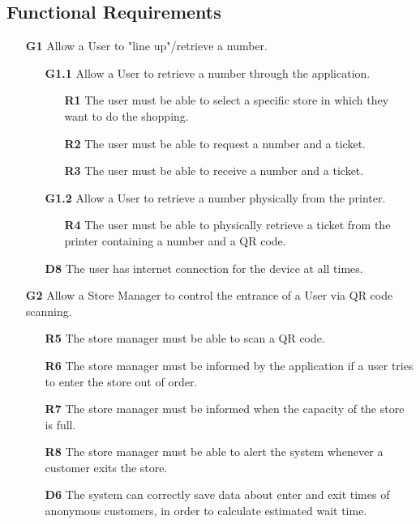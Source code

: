 \subsection{Functional Requirements}
\begin{enumerate}
	\item [\textbf{G1}] Allow a User to "line up"/retrieve a number.
	\begin{enumerate}
		\item [\textbf{G1.1}] Allow a User to retrieve a number through the application.
		\begin{enumerate}
			\item [\textbf{R1}] The user must be able to select a specific store in which they want to do the shopping.
			\item [\textbf{R2}] The user must be able to request a number and a ticket.
			\item [\textbf{R3}] The user must be able to receive a number and a ticket.
		\end{enumerate}
		\item [\textbf{G1.2}] Allow a User to retrieve a number physically from the printer.
		\begin{enumerate}
			\item [\textbf{R4}] The user must be able to physically retrieve a ticket from the printer containing a number and a QR code.		
		\end{enumerate}
		\item [\textbf{D8}] The user has internet connection for the device at all times.
	\end{enumerate}
	\item [\textbf{G2}] Allow a Store Manager to control the entrance of a User via QR code scanning.
	\begin{enumerate}
		\item [\textbf{R5}] The store manager must be able to scan a QR code.
		\item [\textbf{R6}] The store manager must be informed by the application if a user tries to enter the store out of order.
		\item [\textbf{R7}] The store manager must be informed when the capacity of the store is full.
		\item [\textbf{R8}] The store manager must be able to alert the system whenever a customer exits the store.
		\item [\textbf{D6}] The system can correctly save data about enter and exit times of anonymous customers, in order to calculate estimated wait time.

\end{enumerate}
\end{enumerate}
